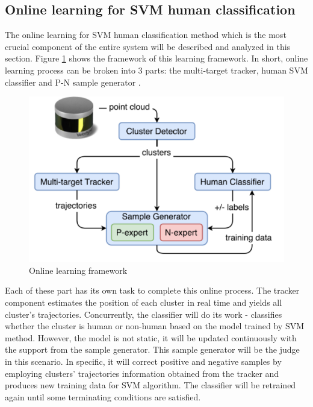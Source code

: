 

\subsection{Online learning for SVM human classification }
\label{online_learning_section}

The online learning for SVM human classification method which is the most crucial
component of the entire system will be described and analyzed in this section. Figure
\ref{Chap3:Fig14} shows the framework of this learning framework. In short, online learning
process can be broken into 3 parts: the multi-target tracker, human SVM classifier and
P-N sample generator \cite{online_learning}.


\begin{figure}[h]
    \centering
    \includegraphics[scale=0.6]{figures/chap3_fig/onlineSVM/3_3_1.png}
    \caption{Online learning framework \cite{online_learning_2020}}
    \label{Chap3:Fig14}
\end{figure}

Each of these part has its own task to complete this online process. The tracker component
estimates the position of each cluster in real time and yields all cluster's trajectories.
Concurrently, the classifier will do its work - classifies whether the cluster is human or
non-human based on the model trained by SVM method. However, the model is not static, it will
be updated continuously with the support from the sample generator. This sample generator
will be the judge in this scenario. In specific, it will correct positive and negative
samples by employing clusters' trajectories information obtained from the tracker and produces
new training data for SVM algorithm. The classifier will be retrained again until some terminating
conditions are satisfied.

